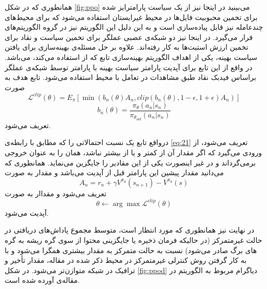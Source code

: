 همانطوری که در شکل \ref{fig:ppo} می‌بینید در اینجا نیز از یک سیاست پارامترایز شده  برای تخمین محبوبیت فایل‌ها در محیط غیرایستان استفاده می‌شود که برای محیط‌های چندعامله نیز قابل پیاده‌سازی است و به این دلیل این الگوریتم نیز در گروه الگوریتم‌های  قرار می‌گیرد. در اینجا نیز دو شبکه‌ی عصبی عملگر برای تخمین سیاست و نقاد برای تخمین ارزش استیت‌ها  به کار رفته‌اند. علاوه بر حل مسئله‌ی بهینه‌سازی برای یافتن سیاست بهینه، یکی از اهداف الگوریتم بهینه‌سازی تابع  که از  استفاده می‌کند، می‌باشد. در واقع از این تابع برای آپدیت پارامتر سیاست بهینه با پارامتر \lr{$\theta$} توسط شبکه‌ی عملگر براساس فیدبک نقاد طبق مشاهدات در تعامل با محیط استفاده می‌شود. تابع هدف  به صورت 
\begin{equation}\label{eq:20}
	\mathcal{L}^{clip}(\theta) = E_{\pi}[\min(b_n(\theta)A_n, clip(b_n(\theta), 1 - \epsilon, 1 + \epsilon)A_n)]
\end{equation}  
\begin{equation}\label{eq:21}
	b_n(\theta) = \frac{\pi_{\theta}(a_n|s_n)}{\pi_{\theta_{old}}(a_n|s_n)}
\end{equation}  
تعریف می‌شود.

درواقع تابع  یک نسبت احتمالاتی  را که مطابق با رابطه‌ی \ref{eq:21} تعریف می‌شود، از ورودی می‌گیرد که اگر مقدار آن از  کمتر و یا از  بیشتر نباشد، همان را به عنوان خروجی برمی‌گرداند و در غیر اینصورت یکی از این مقادیر را جایگزین می‌نماید. همانطوری که می‌دانید  مقدار پیشین این پارامتر قبل از آپدیت می‌باشد و مقدار  به صورت
\begin{equation}\label{eq:20}
	A_n = r_n +‌\gamma V^{\pi_{\theta}}(s_{n+1}) - V^{\pi_{\theta}}(s)
\end{equation}  
تعریف می‌شود و مقداار \lr{$\theta$} به صورت
\begin{equation}\label{eq:20}
	\theta \leftarrow \arg\max \mathcal{L}^{clip}(\theta)
\end{equation}
آپدیت می‌شود.

در نهایت نیز همانطوری که مورد انتظار است، متوسط مجموع پاداش‌های دریافتی در حالت غیرمتمرکز (در حالیکه فرمان ذخیره یا جایگزینی محتوا از سوی گره ریشه به گره های برگ صادر می‌شود) نسبت به حالت متمرکز به مقدار بیشتری همگرا می‌شود و با به کار گرفتن روش کنترلی غیرمتمرکز در محیط ذکر شده در مقاله، مقدار تأخیر و ترافیک در شبکه متوازن‌تر می‌شود.
\pagebreak
در شکل \ref{fig:ppod} دیاگرام مربوط به الگوریتم  در مقاله‌ی \cite{wu2022deep} آورده شده است.

